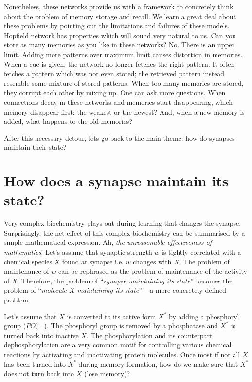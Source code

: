 \documentclass[]{resonance}
\begin{document}

Nonetheless, these networks provide us with a framework to concretely think
about the problem of memory storage and recall. We learn a great deal about
these problems by pointing out the limitations and failures of these models.
Hopfield network has properties which will sound very natural to us. Can you
store as many memories as you like in these networks? No. There is an upper
limit. Adding more patterns over maximum limit causes distortion in memories.
When a cue is given, the network no longer fetches the right pattern. It often
fetches a pattern which was not even stored; the retrieved pattern instead
resemble some mixture of stored patterns. When too many memories are stored,
they corrupt each other by mixing up. One can ask more questions. When
connections decay in these networks and memories start disappearing, which
memory disappear first: the weakest or the newest? And, when a new memory is
added, what happens to the old memories?

After this necessary detour, lets go back to the main theme: how do synapses
maintain their state?

\section{How does a synapse maintain its state?}

Very complex biochemistry plays out during learning that changes the synapse.
Surprisingly, the net effect of this complex biochemistry can be summarised by a
simple mathematical expression. Ah, \emph{the unreasonable effectiveness of
mathematics}\cite{unreasonable_math}! Let's assume that synaptic strength $w$ is
tightly correlated with a chemical species $X$ found at synapse i.e. $w$ changes
with $X$.  The problem of maintenance of $w$ can be rephrased as the problem of
maintenance of the activity of $X$. Therefore, the problem of ``\emph{synapse
maintaining its state}'' becomes the problem of ``\emph{molecule $X$ maintaining
its state}'' -- a more concretely defined problem.

Let's assume that $X$ is converted to its active form $X^*$  by adding a
phosphoryl group ($PO_3^{2-}$). The phosphoryl group is removed by a phosphatase
and $X^*$ is turned back into inactive $X$. The phosphorylation and its
counterpart dephosphorylation are a very common motif for controlling various
chemical reactions by activating and inactivating protein molecules. Once most
if not all $X$ has been turned into $X^*$ during memory formation, how do we
make sure that $X^*$ does not turn back into $X$ (lose memory)?
\end{document}
